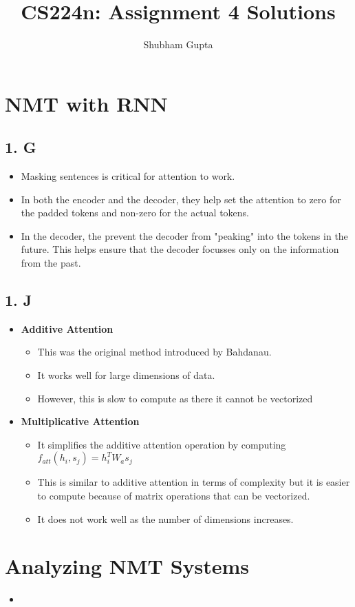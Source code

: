 \documentclass[a4paper]{article}
\title{CS224n: Assignment 4 Solutions}
\author{Shubham Gupta}
\begin{document}
\maketitle
\section{NMT with RNN}
\subsection{1. G}
\begin{itemize}
    \item Masking sentences is critical for attention to work.
    \item In both the encoder and the decoder, they help set the attention to zero for the padded tokens and non-zero for the actual tokens.
    \item In the decoder, the prevent the decoder from "peaking" into the tokens in the future. This helps ensure that the decoder focusses only on the information from the past.
\end{itemize}
\subsection{1. J}
\begin{itemize}
    \item \textbf{Additive Attention} 
        \begin{itemize}
            \item This was the original method introduced by Bahdanau.
            \item It works well for large dimensions of data.
            \item However, this is slow to compute as there it cannot be vectorized
        \end{itemize}
    \item \textbf{Multiplicative Attention} 
        \begin{itemize}
            \item It simplifies the additive attention operation by computing
                $f_{att}(h_i, s_j) = h_i^TW_as_j$
            \item This is similar to additive attention in terms of complexity but it is easier to compute because of matrix operations that can be vectorized.
            \item It does not work well as the number of dimensions increases.
        \end{itemize}
\end{itemize}
\section{Analyzing NMT Systems}
\begin{itemize}
    \item 
\end{itemize}
\end{document}
